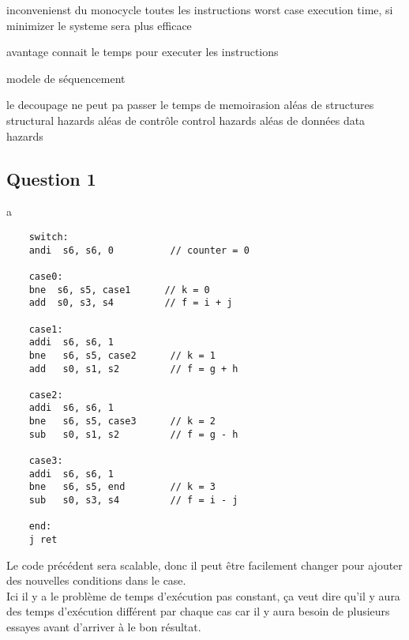 \documentclass{article}
\begin{document}
inconvenienst du monocycle
toutes les instructions
worst case execution time, si minimizer le systeme sera plus efficace

avantage
connait le temps pour executer les instructions


modele de séquencement


le decoupage ne peut pa passer le temps de memoirasion
aléas de structures structural hazards
aléas de contrôle control hazards
aléas de données data hazards


\newpage\subsection*{Question 1}
\begin{resolution}
    a
    \begin{scriptsize}
        \myRISCV
        \begin{lstlisting}
    switch:
    andi  s6, s6, 0          // counter = 0
    
    case0:
    bne  s6, s5, case1      // k = 0
    add  s0, s3, s4         // f = i + j

    case1:
    addi  s6, s6, 1
    bne   s6, s5, case2      // k = 1
    add   s0, s1, s2         // f = g + h

    case2:
    addi  s6, s6, 1
    bne   s6, s5, case3      // k = 2
    sub   s0, s1, s2         // f = g - h

    case3:
    addi  s6, s6, 1
    bne   s6, s5, end        // k = 3
    sub   s0, s3, s4         // f = i - j

    end:
    j ret
        \end{lstlisting}
    \end{scriptsize}
    Le code précédent sera scalable, donc il peut être facilement changer pour ajouter des nouvelles conditions dans le case.\\

    Ici il y a le problème de temps d'exécution pas constant, ça veut dire qu'il y aura des temps d'exécution différent par chaque cas car il y aura besoin de plusieurs essayes avant d'arriver à le bon résultat.
\end{resolution}
\end{document}
